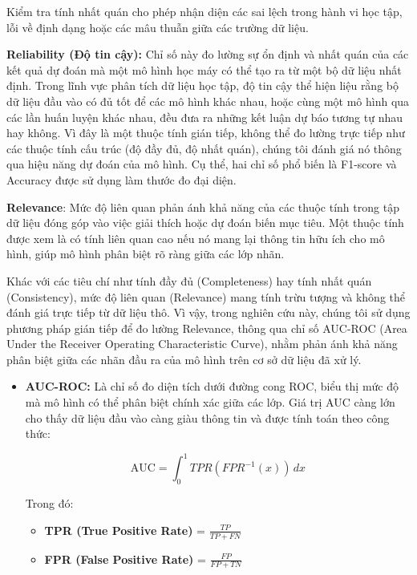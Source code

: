 Kiểm tra tính nhất quán cho phép nhận diện các sai lệch trong hành vi học tập, lỗi về định dạng hoặc các mâu thuẫn giữa các trường dữ liệu. 

\textbf{Reliability (Độ tin cậy):} Chỉ số này đo lường sự ổn định và nhất quán của các kết quả dự đoán mà một mô hình học máy có thể tạo ra từ một bộ dữ liệu nhất định. Trong lĩnh vực phân tích dữ liệu học tập, độ tin cậy thể hiện liệu rằng bộ dữ liệu đầu vào có đủ tốt để các mô hình khác nhau, hoặc cùng một mô hình qua các lần huấn luyện khác nhau, đều đưa ra những kết luận dự báo tương tự nhau hay không. Vì đây là một thuộc tính gián tiếp, không thể đo lường trực tiếp như các thuộc tính cấu trúc (độ đầy đủ, độ nhất quán), chúng tôi đánh giá nó thông qua hiệu năng dự đoán của mô hình. Cụ thể, hai chỉ số phổ biến là F1-score và Accuracy được sử dụng làm thước đo đại diện\cite{zhang2019reliability}.  


\textbf{Relevance}: Mức độ liên quan phản ánh khả năng của các thuộc tính trong tập dữ liệu đóng góp vào việc giải thích hoặc dự đoán biến mục tiêu. Một thuộc tính được xem là có tính liên quan cao nếu nó mang lại thông tin hữu ích cho mô hình, giúp mô hình phân biệt rõ ràng giữa các lớp nhãn.

Khác với các tiêu chí như tính đầy đủ (Completeness) hay tính nhất quán (Consistency), mức độ liên quan (Relevance) mang tính trừu tượng và không thể đánh giá trực tiếp từ dữ liệu thô. Vì vậy, trong nghiên cứu này, chúng tôi sử dụng phương pháp gián tiếp để đo lường Relevance, thông qua chỉ số AUC-ROC (Area Under the Receiver Operating Characteristic Curve), nhằm phản ánh khả năng phân biệt giữa các nhãn đầu ra của mô hình trên cơ sở dữ liệu đã xử lý.
\begin{itemize}
    \item \textbf{AUC-ROC:} Là chỉ số đo diện tích dưới đường cong ROC, biểu thị mức độ mà mô hình có thể phân biệt chính xác giữa các lớp. Giá trị AUC càng lớn cho thấy dữ liệu đầu vào càng giàu thông tin và được tính toán theo công thức:

    \begin{equation}
        \text{AUC} = \int_{0}^{1} TPR(FPR^{-1}(x)) \, dx
    \end{equation}

    Trong đó:
    \begin{itemize}
        \item \textbf{TPR (True Positive Rate)} = $\frac{TP}{TP + FN}$
        \item \textbf{FPR (False Positive Rate)} = $\frac{FP}{FP + TN}$
    \end{itemize}
\end{itemize}

